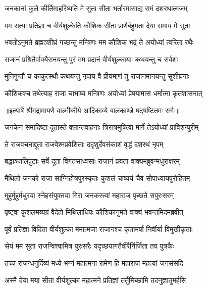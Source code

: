 \twolineshloka
{जनकानां कुले कीर्तिमाहरिष्यति मे सुता}
{सीता भर्तारमासाद्य रामं दशरथात्मजम्} %

\twolineshloka
{मम सत्या प्रतिज्ञा च वीर्यशुल्केति कौशिक}
{सीता प्राणैर्बहुमता देया रामाय मे सुता} %

\twolineshloka
{भवतोऽनुमते ब्रह्मञ्शीघ्रं गच्छन्तु मन्त्रिणः}
{मम कौशिक भद्रं ते अयोध्यां त्वरिता रथैः} %

\twolineshloka
{राजानं प्रश्रितैर्वाक्यैरानयन्तु पुरं मम}
{प्रदानं वीर्यशुल्कायाः कथयन्तु च सर्वशः} %

\twolineshloka
{मुनिगुप्तौ च काकुत्स्थौ कथयन्तु नृपाय वै}
{प्रीयमाणं तु राजानमानयन्तु सुशीघ्रगाः} %

\twolineshloka
{कौशिकश्च तथेत्याह राजा चाभाष्य मन्त्रिणः}
{अयोध्यां प्रेषयामास धर्मात्मा कृतशासनात्} %


{॥इत्यार्षे श्रीमद्रामायणे वाल्मीकीये आदिकाव्ये बालकाण्डे षट्षष्टितमः सर्गः॥}


\twolineshloka
{जनकेन समादिष्टा दूतास्ते क्लान्तवाहनाः}
{त्रिरात्रमुषित्वा मार्गे तेऽयोध्यां प्राविशन्पुरीम्} %

\twolineshloka
{ते राजवचनाद्दूता राजवेश्मप्रवेशिताः}
{ददृशुर्देवसंकाशं वृद्धं दशरथं नृपम्} %

\twolineshloka
{बद्धाञ्जलिपुटाः सर्वे दूता विगतसाध्वसाः}
{राजानं प्रयता वाक्यमब्रुवन्मधुराक्षरम्} %

\twolineshloka
{मैथिलो जनको राजा साग्निहोत्रपुरस्कृतः}
{कुशलं चाव्ययं चैव सोपाध्यायपुरोहितम्} %

\twolineshloka
{मुहुर्मुहुर्मधुरया स्नेहसंयुक्तया गिरा}
{जनकस्त्वां महाराज पृच्छते सपुरःसरम्} %

\twolineshloka
{पृष्ट्वा कुशलमव्यग्रं वैदेहो मिथिलाधिपः}
{कौशिकानुमते वाक्यं भवन्तमिदमब्रवीत्} %

\twolineshloka
{पूर्वं प्रतिज्ञा विदिता वीर्यशुल्का ममात्मजा}
{राजानश्च कृतामर्षा निर्वीर्या विमुखीकृताः} %

\twolineshloka
{सेयं मम सुता राजन्विश्वामित्र पुरःसरैः}
{यदृच्छयागतैर्वीरैर्निर्जिता तव पुत्रकैः} %

\twolineshloka
{तच्च राजन्धनुर्दिव्यं मध्ये भग्नं महात्मना}
{रामेण हि महाराज महत्यां जनसंसदि} %

\twolineshloka
{अस्मै देया मया सीता वीर्यशुल्का महात्मने}
{प्रतिज्ञां तर्तुमिच्छामि तदनुज्ञातुमर्हसि} %

